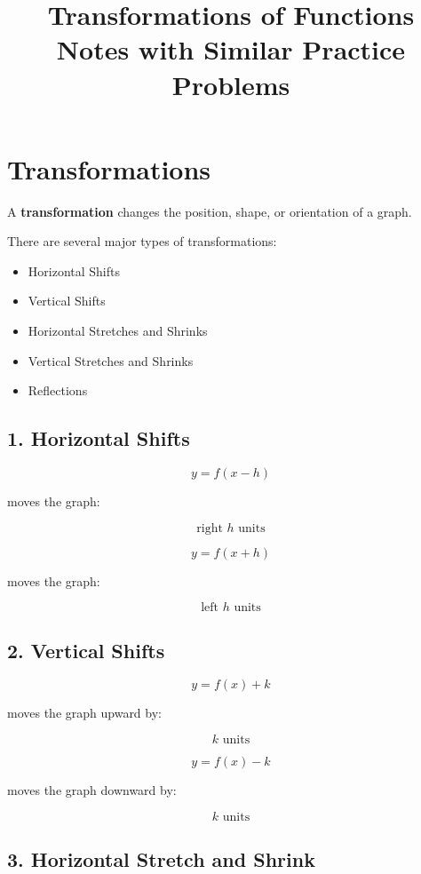 \documentclass[11pt]{article}
\title{\vspace{-0.5in}\textbf{Transformations of Functions}\\[2pt]
       \large Notes with Similar Practice Problems}
\date{}
\author{}
\begin{document}
\maketitle
\vspace{-0.4in}


\section*{Transformations}

A \textbf{transformation} changes the position, shape, or orientation of a graph.

There are several major types of transformations:

\begin{itemize}

\item Horizontal Shifts
\item Vertical Shifts
\item Horizontal Stretches and Shrinks
\item Vertical Stretches and Shrinks
\item Reflections

\end{itemize}

\subsection*{1. Horizontal Shifts}

\[
y=f(x-h)
\]

moves the graph:

\[
\text{right }h\text{ units}
\]

\[
y=f(x+h)
\]

moves the graph:

\[
\text{left }h\text{ units}
\]

\subsection*{2. Vertical Shifts}

\[
y=f(x)+k
\]

moves the graph upward by:

\[
k\text{ units}
\]

\[
y=f(x)-k
\]

moves the graph downward by:

\[
k\text{ units}
\]

\subsection*{3. Horizontal Stretch and Shrink}
\end{document}
